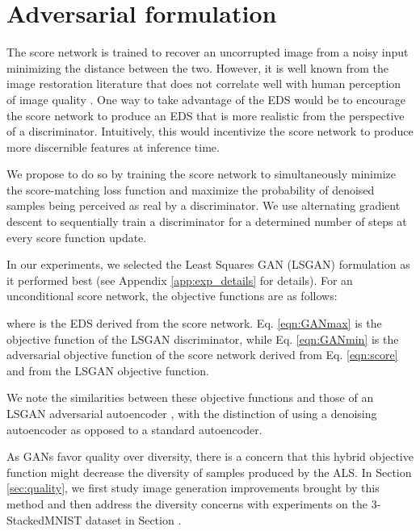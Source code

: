 \documentclass{article} \usepackage{iclr2021_conference_notitle,times}
\theoremstyle{definition}
\theoremstyle{definition}
\begin{document}
\section{Adversarial formulation}\label{sec:adversarial}

The score network is trained to recover an uncorrupted image from a noisy input minimizing the  distance between the two. However, it is well known from the image restoration literature that  does not correlate well with human perception of image quality \citep{zhang2012comprehensive,zhao2016loss}.
One way to take advantage of the EDS would be to encourage the score network to produce an EDS that is more realistic from the perspective of a discriminator. 
Intuitively, this would incentivize the score network to produce more discernible features at inference time.

We propose to do so by training the score network to simultaneously minimize the score-matching loss function and maximize the probability of denoised samples being perceived as real by a discriminator. We use alternating gradient descent to sequentially train a discriminator for a determined number of steps at every score function update. 

In our experiments, we selected the Least Squares GAN (LSGAN) \citep{LSGAN} formulation as it performed best (see Appendix \ref{app:exp_details} for details). For an unconditional score network, the objective functions are as follows:




where  is the EDS derived from the score network.
Eq. \ref{eqn:GANmax} is the objective function of the LSGAN discriminator, while Eq. \ref{eqn:GANmin} is the adversarial objective function of the score network derived from Eq. \ref{eqn:score} and from the LSGAN objective function.

We note the similarities between these objective functions and those of an LSGAN adversarial autoencoder \citep{makhzani2015adversarial, tolstikhin2017wasserstein, tran2018dist}, with the distinction of using a denoising autoencoder  as opposed to a standard autoencoder. 

As GANs favor quality over diversity, there is a concern that this hybrid objective function might decrease the diversity of samples produced by the ALS. In Section \ref{sec:quality}, we first study image generation improvements brought by this method and then address the diversity concerns with experiments on the 3-StackedMNIST \citep{metz2016unrolled} dataset in Section .
\end{document}

